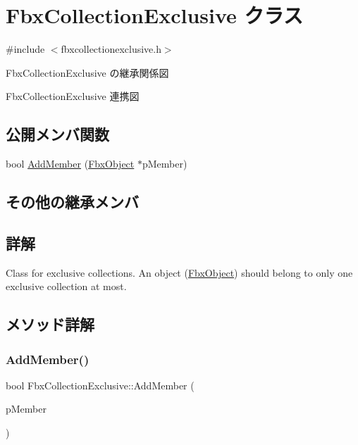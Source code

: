 \hypertarget{class_fbx_collection_exclusive}{}\section{Fbx\+Collection\+Exclusive クラス}
\label{class_fbx_collection_exclusive}


{\ttfamily \#include $<$fbxcollectionexclusive.\+h$>$}



Fbx\+Collection\+Exclusive の継承関係図


Fbx\+Collection\+Exclusive 連携図
\subsection*{公開メンバ関数}
\begin{DoxyCompactItemize}
\item 
bool \hyperlink{class_fbx_collection_exclusive_ab39aa1d3200f5cc628685d7c9eca6fb2}{Add\+Member} (\hyperlink{class_fbx_object}{Fbx\+Object} $\ast$p\+Member)
\end{DoxyCompactItemize}
\subsection*{その他の継承メンバ}


\subsection{詳解}
Class for exclusive collections. An object (\hyperlink{class_fbx_object}{Fbx\+Object}) should belong to only one exclusive collection at most. 

\subsection{メソッド詳解}
\mbox{\label{class_fbx_collection_exclusive_ab39aa1d3200f5cc628685d7c9eca6fb2}} 
\subsubsection{\texorpdfstring{Add\+Member()}{AddMember()}}
{\footnotesize\ttfamily bool Fbx\+Collection\+Exclusive\+::\+Add\+Member (\begin{DoxyParamCaption}\item[{\hyperlink{class_fbx_object}{Fbx\+Object} $\ast$}]{p\+Member }\end{DoxyParamCaption})\hspace{0.3cm}{\ttfamily [virtual]}}

